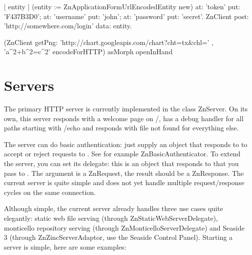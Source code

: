 \documentclass[a4paper,10pt,twoside]{book}
\begin{document}
\begin{code}{}
| entity |
(entity := ZnApplicationFormUrlEncodedEntity new)
  at: 'token' put: 'F437B3D0';
  at: 'username' put: 'john';
  at: 'password' put: 'secret'.
ZnClient post: 'http://somewhere.com/login' data: entity.
\end{code}


\begin{code}{}
(ZnClient getPng: 'http://chart.googleapis.com/chart?cht=tx&chl=' ,
'a^2+b^2=c^2' encodeForHTTP) asMorph openInHand
\end{code}

%




\section{Servers}

The primary HTTP server is currently implemented in the class ZnServer. On its own, this server responds with a welcome page on /, has a debug handler for all paths starting with /echo and responds with file not found for everything else.

The server can do basic authentication: just supply an object that responds to  to accept or reject requests to . See for example ZnBasicAuthenticator. To extend the server, you can set its delegate: this is an object that responds to  that you pass to . The argument is a ZnRequest, the result should be a ZnResponse. The current server is quite simple and does not yet handle multiple request/response cycles on the same connection.

Although simple, the current server already handles three use cases quite elegantly: static web file serving (through ZnStaticWebServerDelegate), monticello repository serving (through ZnMonticelloServerDelegate) and Seaside 3 (through ZnZincServerAdaptor, use the Seaside Control Panel). Starting a server is simple, here are some examples:
\end{document}
